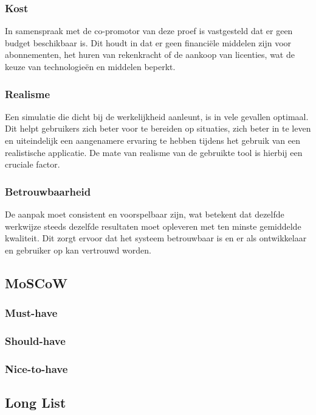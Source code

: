 \subsubsection{Kost}

In samenspraak met de co-promotor van deze proef is vastgesteld dat er geen budget beschikbaar is. Dit houdt in dat er geen financiële middelen zijn voor abonnementen, het huren van rekenkracht of de aankoop van licenties, wat de keuze van technologieën en middelen beperkt.

\subsubsection{Realisme}

Een simulatie die dicht bij de werkelijkheid aanleunt, is in vele gevallen optimaal. Dit helpt gebruikers zich beter voor te bereiden op situaties, zich beter in te leven en uiteindelijk een aangenamere ervaring te hebben tijdens het gebruik van een realistische applicatie. De mate van realisme van de gebruikte tool is hierbij een cruciale factor.

\subsubsection{Betrouwbaarheid}

De aanpak moet consistent en voorspelbaar zijn, wat betekent dat dezelfde werkwijze steeds dezelfde resultaten moet opleveren met ten minste gemiddelde kwaliteit. Dit zorgt ervoor dat het systeem betrouwbaar is en er als ontwikkelaar en gebruiker op kan vertrouwd worden.

\subsection{MoSCoW}



\subsubsection{Must-have}
\subsubsection{Should-have}
\subsubsection{Nice-to-have}

\subsection{Long List}

